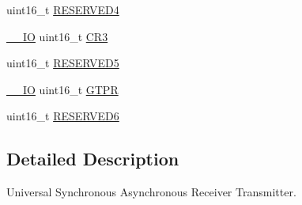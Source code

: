 \begin{DoxyCompactItemize}
\item 
uint16\-\_\-t \hyperlink{struct_u_s_a_r_t___type_def_aa0223808025f5bf9c056185038c9d545}{R\-E\-S\-E\-R\-V\-E\-D4}
\item 
\hyperlink{group___c_m_s_i_s__core__definitions_gaec43007d9998a0a0e01faede4133d6be}{\-\_\-\-\_\-\-I\-O} uint16\-\_\-t \hyperlink{struct_u_s_a_r_t___type_def_a9651ce2df8eec57b9cab2f27f6dbf3e1}{C\-R3}
\item 
uint16\-\_\-t \hyperlink{struct_u_s_a_r_t___type_def_abd36010ac282682d1f3c641b183b1b6f}{R\-E\-S\-E\-R\-V\-E\-D5}
\item 
\hyperlink{group___c_m_s_i_s__core__definitions_gaec43007d9998a0a0e01faede4133d6be}{\-\_\-\-\_\-\-I\-O} uint16\-\_\-t \hyperlink{struct_u_s_a_r_t___type_def_a26f8b74978e03c8a4c99c9395a6a524d}{G\-T\-P\-R}
\item 
uint16\-\_\-t \hyperlink{struct_u_s_a_r_t___type_def_aab502dde158ab7da8e7823d1f8a06edb}{R\-E\-S\-E\-R\-V\-E\-D6}
\end{DoxyCompactItemize}


\subsection{Detailed Description}
Universal Synchronous Asynchronous Receiver Transmitter. 

